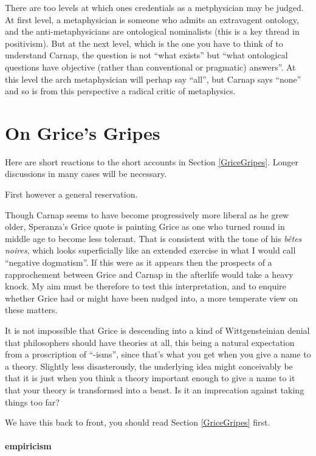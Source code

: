 \documentclass[10pt,titlepage]{book}
\begin{document}
There are too levels at which ones credentials as a metphysician may be judged.
At first level, a metaphysician is someone who admits an extravagent ontology, and the anti-metaphysicians are ontological nominalists (this is a key thread in positivism).
But at the next level, which is the one you have to think of to understand Carnap, the question is not ``what exists'' but ``what ontological questions have objective (rather than conventional or pragmatic) answers''.
At this level the arch metaphysician will perhap say ``all'', but Carnap says ``none'' and so is from this perspective a radical critic of metaphysics.

\section{On Grice's Gripes}

Here are short reactions to the short accounts in Section \ref{GriceGripes}.
Longer discussions in many cases will be necessary.

First however a general reservation.

Though Carnap seems to have become progressively more liberal as he grew older, Speranza's Grice quote is painting Grice as one who turned round in middle age to become less tolerant.
That is consistent with the tone of his {\it b\^etes noires}, which looks superficially like an extended exercise in what I would call ``negative dogmatism''.
If this were as it appears then the prospects of a rapprochement between Grice and Carnap in the afterlife would take a heavy knock.
My aim must be therefore to test this interpretation, and to enquire whether Grice had or might have been nudged into, a more temperate view on these matters. 

It is not impossible that Grice is descending into a kind of Wittgensteinian denial that philosophers should have theories at all, this being a natural expectation from a proscription of ``-isms'', since that's what you get when you give a name to a theory.
Slightly less disasterously, the underlying idea might conceivably be that it is just when you think a theory important enough to give a name to it that your theory is transformed into a beast.
Is it an imprecation against taking things too far?

We have this back to front, you should read Section \ref{GriceGripes} first.

\paragraph{empiricism}
\end{document}
